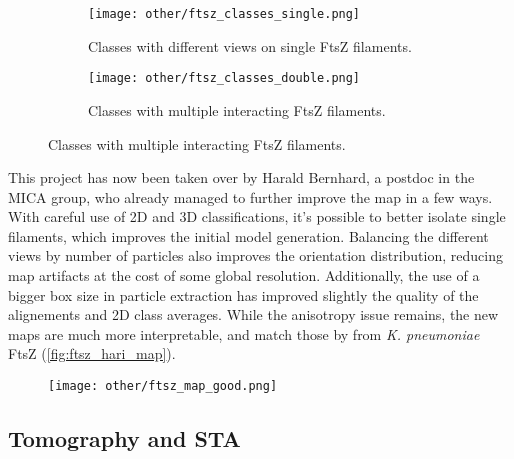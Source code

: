\begin{figure}[ht]
    \centering
    \begin{subfigure}[B]{.5\textwidth}
        \centering
        \texttt{[image: other/ftsz\_classes\_single.png]}
        \caption{Classes with different views on single FtsZ filaments.}
        \label{fig:ftsz_ddm_classes_single}
    \end{subfigure}%
    \hfill
    \begin{subfigure}[B]{.5\textwidth}
        \centering
        \texttt{[image: other/ftsz\_classes\_double.png]}
        \caption{Classes with multiple interacting FtsZ filaments.}
        \label{fig:ftsz_ddm_classes_double}
    \end{subfigure}%
    \label{fig:ftsz_ddm_classes}
\end{figure}

This project has now been taken over by Harald Bernhard, a postdoc in the MICA group, who already managed to further improve the map in a few ways.
With careful use of 2D and 3D classifications, it's possible to better isolate single filaments, which improves the initial model generation.
Balancing the different views by number of particles also improves the orientation distribution, reducing map artifacts at the cost of some global resolution.
Additionally, the use of a bigger box size in particle extraction has improved slightly the quality of the alignements and 2D class averages.
While the anisotropy issue remains, the new maps are much more interpretable, and match those by \citet{fujitaStructuresFtsZSingle2023} from \textit{K. pneumoniae} FtsZ (\autoref{fig:ftsz_hari_map}).

\begin{figure}[ht]
    \centering
    \texttt{[image: other/ftsz\_map\_good.png]}
    \label{fig:ftsz_hari_map}
\end{figure}

\subsection{Tomography and STA}

